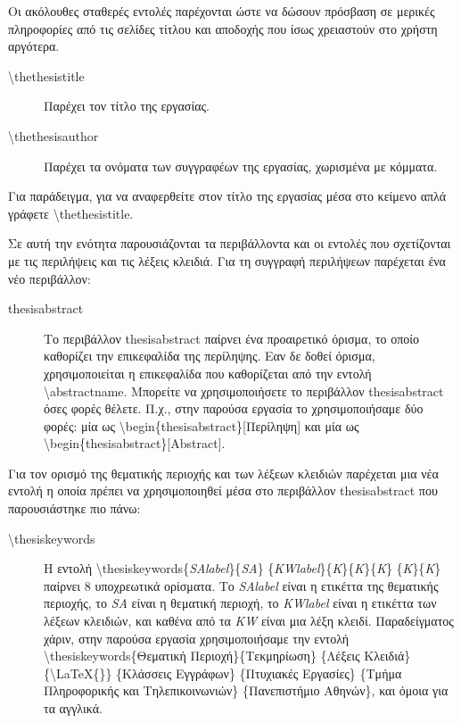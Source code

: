 \documentclass{dithesis}
\begin{document}
        Οι ακόλουθες σταθερές εντολές παρέχονται ώστε να δώσουν πρόσβαση σε μερικές 
        πληροφορίες από τις σελίδες τίτλου και αποδοχής που ίσως χρειαστούν στο χρήστη 
        αργότερα.
        \begin{description}
        \item[\textbackslash{thethesistitle}]
            Παρέχει τον τίτλο της εργασίας.
        \item[\textbackslash{thethesisauthor}]
            Παρέχει τα ονόματα των συγγραφέων της εργασίας, χωρισμένα με κόμματα.
        \end{description}

        Για παράδειγμα, για να αναφερθείτε στον τίτλο της εργασίας μέσα στο κείμενο
        απλά γράφετε \textbackslash{thethesistitle}.

    Σε αυτή την ενότητα παρουσιάζονται τα περιβάλλοντα και οι εντολές που 
    σχετίζονται με τις περιλήψεις και τις λέξεις κλειδιά.
        Για τη συγγραφή περιλήψεων παρέχεται ένα νέο περιβάλλον:
        \begin{description}
        \item[thesisabstract]
          Το περιβάλλον thesisabstract παίρνει ένα προαιρετικό όρισμα, το οποίο 
          καθορίζει την επικεφαλίδα της περίληψης.
          Εαν δε δοθεί όρισμα, χρησιμοποιείται η επικεφαλίδα που καθορίζεται από
          την εντολή \textbackslash{abstractname}.
          Μπορείτε να χρησιμοποιήσετε το περιβάλλον thesisabstract όσες φορές θέλετε.
          Π.χ., στην παρούσα εργασία το χρησιμοποιήσαμε δύο φορές:
          μία ως \textbackslash{begin}\{thesisabstract\}{[}Περίληψη{]} και μία
          ως \textbackslash{begin}\{thesisabstract\}{[Abstract]}.
        \end{description}
        Για τον ορισμό της θεματικής περιοχής και των λέξεων κλειδιών παρέχεται μια
        νέα εντολή η οποία πρέπει να χρησιμοποιηθεί μέσα στο περιβάλλον thesisabstract
        που παρουσιάστηκε πιο πάνω:
        \begin{description}
        \item[\textbackslash{thesiskeywords}]
            Η εντολή \textbackslash{thesiskeywords}\{\textit{SAlabel}\}\{\textit{SA}\}%
            \{\textit{KWlabel}\}\{\textit{K}\}\{\textit{K}\}\{\textit{K}\}%
            \{\textit{K}\}\{\textit{K}\} παίρνει 8 υποχρεωτικά ορίσματα.
            Το \textit{SAlabel} είναι η ετικέττα της θεματικής περιοχής,
            το \textit{SA} είναι η θεματική περιοχή, το \textit{KWlabel} είναι
            η ετικέττα των λέξεων κλειδιών, και καθένα από τα \textit{KW} είναι μια λέξη
            κλειδί.
            Παραδείγματος χάριν, στην παρούσα εργασία χρησιμοποιήσαμε την εντολή
            \textbackslash{thesiskeywords}\{Θεματική Περιοχή\}\{Τεκμηρίωση\}
            \{Λέξεις Κλειδιά\} \{\textbackslash{LaTeX}\{\}\} \{Κλάσσεις Εγγράφων\}
            \{Πτυχιακές Εργασίες\} \{Τμήμα Πληροφορικής και Τηλεπικοινωνιών\}
            \{Πανεπιστήμιο Αθηνών\}, και όμοια για τα αγγλικά.
        \end{description}
\end{document}
